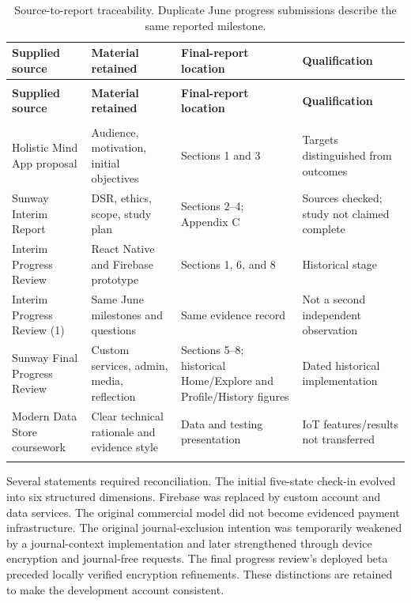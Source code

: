 \begingroup
\small{}
\setlength{\tabcolsep}{4pt}
\setlength{\TableInnerWidth}{\dimexpr\linewidth-24pt\relax}
\begin{longtable}{@{}>{\raggedright\arraybackslash}p{0.240\TableInnerWidth} >{\raggedright\arraybackslash}p{0.290\TableInnerWidth} >{\raggedright\arraybackslash}p{0.240\TableInnerWidth} >{\raggedright\arraybackslash}p{0.230\TableInnerWidth}@{}}
\caption{Source-to-report traceability. Duplicate June progress submissions describe the same reported milestone.}\label{tab:table-5}\\
\toprule
\textbf{Supplied source} & \textbf{Material retained} & \textbf{Final-report location} & \textbf{Qualification} \\
\midrule\endfirsthead
\multicolumn{4}{l}{\textit{Table \thetable\ continued}}\\
\toprule
\textbf{Supplied source} & \textbf{Material retained} & \textbf{Final-report location} & \textbf{Qualification} \\
\midrule\endhead
\midrule\multicolumn{4}{r}{\textit{Continued on next page}}\\\endfoot
\bottomrule\endlastfoot
Holistic Mind App proposal & Audience, motivation, initial objectives & Sections 1 and 3 & Targets distinguished from outcomes \\ \addlinespace[4pt]
Sunway Interim Report & DSR, ethics, scope, study plan & Sections 2--4; Appendix C & Sources checked; study not claimed complete \\ \addlinespace[4pt]
Interim Progress Review & React Native and Firebase prototype & Sections 1, 6, and 8 & Historical stage \\ \addlinespace[4pt]
Interim Progress Review (1) & Same June milestones and questions & Same evidence record & Not a second independent observation \\ \addlinespace[4pt]
Sunway Final Progress Review & Custom services, admin, media, reflection & Sections 5--8; historical Home/\allowbreak{}Explore and Profile/\allowbreak{}History figures & Dated historical implementation \\ \addlinespace[4pt]
Modern Data Store coursework & Clear technical rationale and evidence style & Data and testing presentation & IoT features/\allowbreak{}results not transferred \\ \addlinespace[4pt]
\end{longtable}
\endgroup

Several statements required reconciliation. The initial five-state check-in evolved into six structured dimensions. Firebase was replaced by custom account and data services. The original commercial model did not become evidenced payment infrastructure. The original journal-exclusion intention was temporarily weakened by a journal-context implementation and later strengthened through device encryption and journal-free requests. The final progress review's deployed beta preceded locally verified encryption refinements. These distinctions are retained to make the development account consistent.

